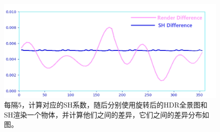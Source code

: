 \begin{figure}
    \includegraphics[width=1.0\textwidth]{Img/sh-render-diff.png}
    \caption[SH系数与渲染结果之间的不一致性]{
        \label{fig:sh-render-diff}
    每隔5，计算对应的SH系数，随后分别使用旋转后的HDR全景图和SH渲染一个物体，并计算他们之间的差异，它们之间的差异分布如图。
    }
\end{figure}